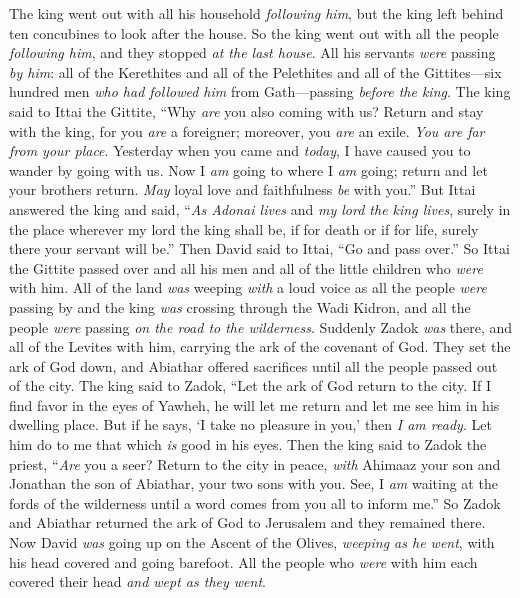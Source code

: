 \begin{biblechapter}
\verse The king went out with all his household \textit{following him}, but the king left behind ten concubines to look after the house.
\verse So the king went out with all the people \textit{following him}, and they stopped \textit{at the last house}.
\verse All his servants \textit{were} passing \textit{by him}: all of the Kerethites and all of the Pelethites and all of the Gittites—six hundred men \textit{who had followed him} from Gath—passing \textit{before the king}.
\verse The king said to Ittai the Gittite, “Why \textit{are} you also coming with us? Return and stay with the king, for you \textit{are} a foreigner; moreover, you \textit{are} an exile. \textit{You \textit{are} far from your place}.
\verse Yesterday when you came and \textit{today}, I have caused you to wander by going with us. Now I \textit{am} going to where I \textit{am} going; return and let your brothers return. \textit{May} loyal love and faithfulness \textit{be} with you.”
\verse But Ittai answered the king and said, “\textit{As Adonai lives} and \textit{my lord the king lives}, surely in the place wherever my lord the king shall be, if for death or if for life, surely there your servant will be.”
\verse Then David said to Ittai, “Go and pass over.” So Ittai the Gittite passed over and all his men and all of the little children who \textit{were} with him.
\verse All of the land \textit{was} weeping \textit{with} a loud voice as all the people \textit{were} passing by and the king \textit{was} crossing through the Wadi Kidron, and all the people \textit{were} passing \textit{on the road to the wilderness}.
 Suddenly Zadok \textit{was} there, and all of the Levites with him, carrying the ark of the covenant of God. They set the ark of God down, and Abiathar offered sacrifices until all the people passed out of the city.
\verse The king said to Zadok, “Let the ark of God return to the city. If I find favor in the eyes of Yawheh, he will let me return and let me see him in his dwelling place.
\verse But if he says, ‘I take no pleasure in you,’ then \textit{I am ready}. Let him do to me that which \textit{is} good in his eyes.
\verse Then the king said to Zadok the priest, “\textit{Are} you a seer? Return to the city in peace, \textit{with} Ahimaaz your son and Jonathan the son of Abiathar, your two sons with you.
\verse See, I \textit{am} waiting at the fords of the wilderness until a word comes from you all to inform me.”
\verse So Zadok and Abiathar returned the ark of God to Jerusalem and they remained there.
 Now David \textit{was} going up on the Ascent of the Olives, \textit{weeping as he went}, with his head covered and going barefoot. All the people who \textit{were} with him each covered their head \textit{and wept as they went}.

\end{biblechapter}
